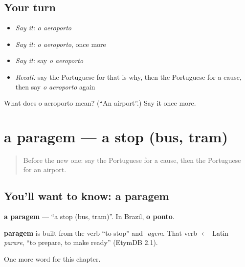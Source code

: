 \subsection*{Your turn}
\begin{itemize}
\raggedright
  \item \emph{Say it:} \emph{o aeroporto}
  \item \emph{Say it:} \emph{o aeroporto}, once more
  \item \emph{Say it:} say \emph{o aeroporto}
  \item \emph{Recall:} say the Portuguese for that is why, then the Portuguese for a cause, then say \emph{o aeroporto} again
\end{itemize}

\begin{tcolorbox}[breakable,colback=teal!4,colframe=teal!35!black,title={Before you move on}]
What does o aeroporto mean? (\textquotedblleft{}An airport\textquotedblright{}.) Say it once more.
\end{tcolorbox}
\section[a paragem]{a paragem — a stop (bus, tram)}

\label{lesson:PT-C85-paragem}



\begin{quote}
Before the new one: say the Portuguese for a cause, then the Portuguese for an airport.
\end{quote}

\subsection*{You'll want to know: a paragem}
\textbf{a paragem} — \textquotedblleft{}a stop (bus, tram)\textquotedblright{}. In Brazil, \textbf{o ponto}.

\begin{cousinweb}
\textbf{paragem} is built from the verb \textquotedblleft{}to stop\textquotedblright{} and \emph{-agem}. That verb $\leftarrow$ Latin \emph{parare}, \textquotedblleft{}to prepare, to make ready\textquotedblright{} (EtymDB 2.1).
\end{cousinweb}

\begin{grammarlens}[title={What you've built}]
One more word for this chapter.
\end{grammarlens}

